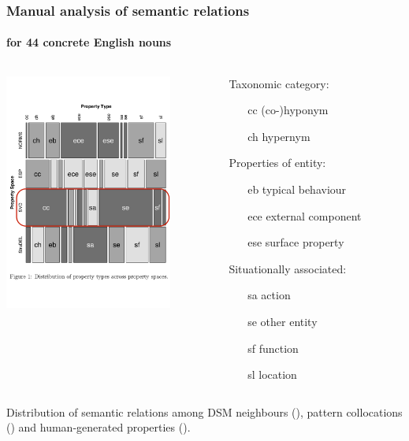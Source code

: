 \documentclass[t]{beamer} %
\begin{document}
\begin{frame}
  \frametitle{Manual analysis of semantic relations}
  \framesubtitle{for 44 concrete English nouns \citep{Baroni:Lenci:08}}

  \ungap[1]
  \begin{columns}[c]
    \begin{column}{6cm}
      \includegraphics[width=5.5cm]{img/BaroniLenci2008_fig1}%
    \end{column}
    \begin{column}{4cm}
      \footnotesize
      Taxonomic category:
      \begin{itemize}\setlength{\itemsep}{0pt}\setlength{\parskip}{0pt}\vspace{-\topsep}
      \item[cc] (co-)hyponym
      \item[ch] hypernym 
      \end{itemize}
      Properties of entity:
      \begin{itemize}\setlength{\itemsep}{0pt}\setlength{\parskip}{0pt}\vspace{-\topsep}
      \item[eb] typical behaviour
      \item[ece] external component
      \item[ese] surface property
      \end{itemize}
      Situationally associated:
      \begin{itemize}\setlength{\itemsep}{0pt}\setlength{\parskip}{0pt}\vspace{-\topsep}
      \item[sa] action
      \item[se] other entity
      \item[sf] function
      \item[sl] location
      \end{itemize}
    \end{column}
  \end{columns}

  \footnotesize\gap[1]
  Distribution of semantic relations among DSM neighbours (), pattern collocations () and human-generated properties ().
\end{frame}
\end{document}
